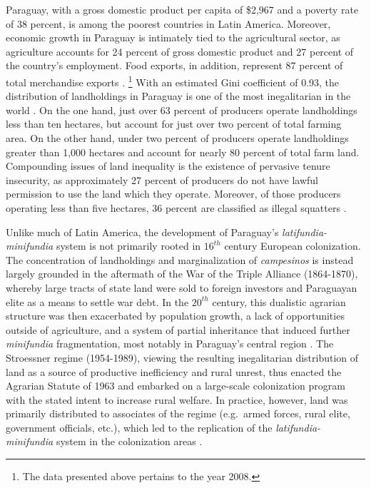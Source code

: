\documentclass[english]{article}
\begin{document}
Paraguay, with a gross domestic product per capita of \$2,967 and a poverty 
rate of 38 percent, is among the poorest countries in Latin America. 
Moreover, economic growth in Paraguay is intimately tied to the agricultural 
sector, as agriculture accounts for 24 percent of gross domestic product and 
27 percent of the country's employment. 
Food exports, in addition, represent 87 percent of total merchandise exports 
\citep{wdi2012}.%
\footnote{The data presented above pertains to the year 2008.} 
With an estimated Gini coefficient of 0.93, the distribution of landholdings in 
Paraguay is one of the most inegalitarian in the world \citep{lipton2009}. 
On the one hand, just over 63 percent of producers operate landholdings less 
than ten hectares, but account for just over two percent of total farming area.  
On the other hand, under two percent of producers operate landholdings 
greater than 1,000 hectares and account for nearly 80 percent of total farm 
land. 
Compounding issues of land inequality is the existence of pervasive tenure 
insecurity, as approximately 27 percent of producers do not have lawful 
permission to use the land which they operate. 
Moreover, of those producers operating less than five hectares, 36 percent are 
classified as illegal squatters \citep{mag2012}. 

Unlike much of Latin America, the development of Paraguay's 
\emph{latifundia-minifundia} system is not primarily rooted in $16^{th}$ 
century European colonization.
The concentration of landholdings and marginalization of 
\emph{campesinos} is instead largely grounded in the aftermath of the War 
of the Triple Alliance (1864-1870), whereby large tracts of state land were sold 
to foreign investors and Paraguayan elite as a means to settle war debt.
In the $20^{th}$ century, this dualistic agrarian structure was then exacerbated 
by population growth, a lack of opportunities outside of
agriculture, and a system of partial inheritance that induced further 
\emph{minifundia} fragmentation, most notably in Paraguay's central region
\citep{baer1984, danielsen2009}.
The Stroessner regime (1954-1989), viewing the resulting inegalitarian 
distribution of land as a source of productive inefficiency and rural unrest, 
thus enacted the Agrarian Statute of 1963 and embarked on a large-scale 
colonization program with the stated intent to increase rural welfare.
In practice, however, land was primarily distributed to associates of the 
regime (e.g.\ armed forces, rural elite, government officials, etc.), which led to 
the replication of the \emph{latifundia-minifundia} system in the 
colonization areas \citep{weisskoff1992, nagel1999}.
\end{document}
